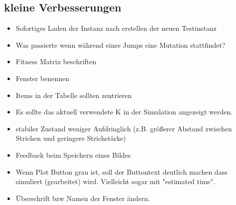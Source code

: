 \documentclass{article}
\begin{document}
\subsection{kleine Verbesserungen}
	\begin{itemize}
		\item Sofortiges Laden der Instanz nach erstellen der neuen Testinstanz
		\item Was passierte wenn während eines Jumps eine Mutation stattfindet?
		\item Fitness Matrix beschriften
		\item Fenster benennen
		\item Items in der Tabelle sollten zentrieren
		\item Es sollte das aktuell verwendete K in der Simulation angezeigt werden.
		\item stabiler Zustand weniger Aufdringlich (z.B. größerer Abstand zwischen Strichen und geringere Strichstärke)
		\item Feedback beim Speichern eines Bildes
		\item Wenn Plot Button grau ist, soll der Buttontext deutlich machen dass simuliert (gearbeitet) wird. Vielleicht sogar mit "{}estimated time"{}.
		\item Überschrift bzw Namen der Fenster ändern.
	\end{itemize}
\end{document}
